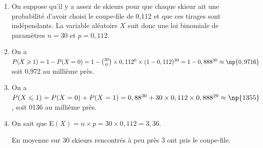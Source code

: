 \begin{enumerate}
\item 
On suppose qu'il y a assez de skieurs pour que chaque skieur ait une probabilité d'avoir choisi le coupe-file de 0,112 et que ces tirages sont indépendants. La variable aléatoire $X$ suit donc une loi binomiale de paramètres $n = 30$ et $p = 0,112$. 
\item 
On a $P(X \geqslant 1) = 1 - P(X = 0) = 1 - \binom{30}{0} \times 0,112^0 \times (1 - 0,112)^{30} = 1 - 0,888^{30} \approx \np{0,9716}$ soit 0,972 au millième près.
\item 
On a $P(X \leqslant 1) = P(X = 0) + P(X = 1) = 0,88^{30} + 30 \times 0,112 \times 0,888^{29} \approx \np{1355}$, soit 0136 au millième près.

\item 
On sait que E$(X) = n \times p = 30 \times 0,112 = 3,36$.

En moyenne sur 30 skieurs rencontrés à peu près 3 ont pris le coupe-file.
\end{enumerate}

\bigskip
